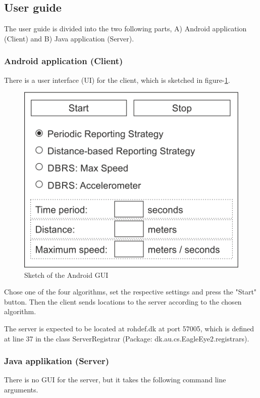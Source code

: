 \subsection{User guide}
The user guide is divided into the two following parts, A) Android application (Client) and B) Java application (Server).

\subsubsection*{Android application (Client)}
There is a user interface (UI) for the client, which is sketched in figure-\ref{androidgui}.

\begin{figure}[h]
\includegraphics{GUI}
\caption{Sketch of the Android GUI}
\label{androidgui}
\end{figure}

Chose one of the four algorithms, set the respective settings and press the "Start" button. Then the client sends locations to the server according to the chosen algorithm.

The server is expected to be located at rohdef.dk at port 57005, which is defined at line 37 in the class ServerRegistrar (Package: dk.au.cs.EagleEye2.registrars).

\subsubsection*{Java applikation (Server)}
There is no GUI for the server, but it takes the following command line arguments.

